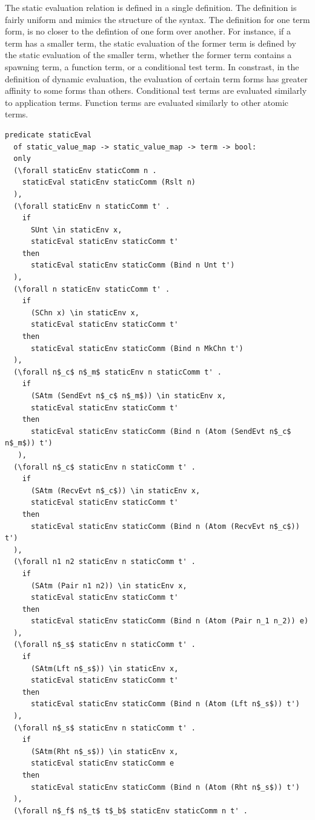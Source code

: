 \documentclass[10pt]{article}
\begin{document}
The static evaluation relation is defined in a single definition.
The definition is fairly uniform and mimics the structure of the syntax.
The definition for one term form, is no closer to the defintion of one form over another.
For instance, if a term has a smaller term,
the static evaluation of the former term is defined
by the static evaluation of the smaller term,
whether the former term contains a spawning term, a function term, or a conditional test term.
In constrast, in the definition of dynamic evaluation,
the evaluation of certain term forms has greater affinity to some forms than others.
Conditional test terms are evaluated similarly to application terms. 
Function terms are evaluated similarly to other atomic terms.


\begin{lstlisting}[language=logic, mathescape]
  predicate staticEval
  of static_value_map -> static_value_map -> term -> bool:
  only
  (\forall staticEnv staticComm n .
    staticEval staticEnv staticComm (Rslt n)
  ),
  (\forall staticEnv n staticComm t' .
    if 
      SUnt \in staticEnv x,
      staticEval staticEnv staticComm t'
    then
      staticEval staticEnv staticComm (Bind n Unt t')
  ),
  (\forall n staticEnv staticComm t' .
    if 
      (SChn x) \in staticEnv x,
      staticEval staticEnv staticComm t'
    then  
      staticEval staticEnv staticComm (Bind n MkChn t')
  ),
  (\forall n$_c$ n$_m$ staticEnv n staticComm t' .
    if
      (SAtm (SendEvt n$_c$ n$_m$)) \in staticEnv x,
      staticEval staticEnv staticComm t' 
    then
      staticEval staticEnv staticComm (Bind n (Atom (SendEvt n$_c$ n$_m$)) t')
   ),
  (\forall n$_c$ staticEnv n staticComm t' . 
    if 
      (SAtm (RecvEvt n$_c$)) \in staticEnv x,
      staticEval staticEnv staticComm t'
    then
      staticEval staticEnv staticComm (Bind n (Atom (RecvEvt n$_c$)) t')
  ),
  (\forall n1 n2 staticEnv n staticComm t' .
    if
      (SAtm (Pair n1 n2)) \in staticEnv x,
      staticEval staticEnv staticComm t'
    then
      staticEval staticEnv staticComm (Bind n (Atom (Pair n_1 n_2)) e)
  ),
  (\forall n$_s$ staticEnv n staticComm t' .
    if
      (SAtm(Lft n$_s$)) \in staticEnv x,
      staticEval staticEnv staticComm t' 
    then
      staticEval staticEnv staticComm (Bind n (Atom (Lft n$_s$)) t')
  ),
  (\forall n$_s$ staticEnv n staticComm t' .
    if
      (SAtm(Rht n$_s$)) \in staticEnv x, 
      staticEval staticEnv staticComm e
    then
      staticEval staticEnv staticComm (Bind n (Atom (Rht n$_s$)) t')
  ),
  (\forall n$_f$ n$_t$ t$_b$ staticEnv staticComm n t' .

\end{lstlisting}
\end{document}
